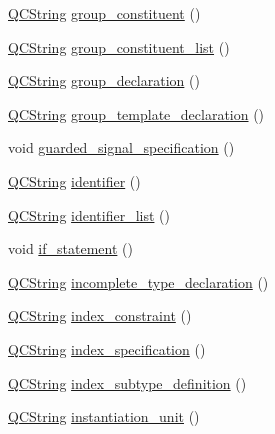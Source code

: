 \begin{DoxyCompactItemize}
\item 
\hyperlink{class_q_c_string}{Q\+C\+String} \hyperlink{classvhdl_1_1parser_1_1_vhdl_parser_a97749f490323d716d39fd7ecaebf63bf}{group\+\_\+constituent} ()
\item 
\hyperlink{class_q_c_string}{Q\+C\+String} \hyperlink{classvhdl_1_1parser_1_1_vhdl_parser_afd7e0fa85b81e44cf87f11a393a92e17}{group\+\_\+constituent\+\_\+list} ()
\item 
\hyperlink{class_q_c_string}{Q\+C\+String} \hyperlink{classvhdl_1_1parser_1_1_vhdl_parser_ac68228d413ae86f8b7cb3216a14e1945}{group\+\_\+declaration} ()
\item 
\hyperlink{class_q_c_string}{Q\+C\+String} \hyperlink{classvhdl_1_1parser_1_1_vhdl_parser_a5b0d30e1e2efb8c9725745d3f38cda4a}{group\+\_\+template\+\_\+declaration} ()
\item 
void \hyperlink{classvhdl_1_1parser_1_1_vhdl_parser_a38e3e2af85ac4ce21f7150f22e68a14c}{guarded\+\_\+signal\+\_\+specification} ()
\item 
\hyperlink{class_q_c_string}{Q\+C\+String} \hyperlink{classvhdl_1_1parser_1_1_vhdl_parser_aba63d9a8e428979881447d900b5dbe6e}{identifier} ()
\item 
\hyperlink{class_q_c_string}{Q\+C\+String} \hyperlink{classvhdl_1_1parser_1_1_vhdl_parser_a57592cdbbae53ae887816581935488d2}{identifier\+\_\+list} ()
\item 
void \hyperlink{classvhdl_1_1parser_1_1_vhdl_parser_a21fbcf1d3710f05ecf79b3ec0947334e}{if\+\_\+statement} ()
\item 
\hyperlink{class_q_c_string}{Q\+C\+String} \hyperlink{classvhdl_1_1parser_1_1_vhdl_parser_a3207beb07fbe39a9ea6fc38e8099729b}{incomplete\+\_\+type\+\_\+declaration} ()
\item 
\hyperlink{class_q_c_string}{Q\+C\+String} \hyperlink{classvhdl_1_1parser_1_1_vhdl_parser_ab18f12daec25ca7d98c790f7b4e6a4f4}{index\+\_\+constraint} ()
\item 
\hyperlink{class_q_c_string}{Q\+C\+String} \hyperlink{classvhdl_1_1parser_1_1_vhdl_parser_ac8c36a4bc347127435759189cd3ba401}{index\+\_\+specification} ()
\item 
\hyperlink{class_q_c_string}{Q\+C\+String} \hyperlink{classvhdl_1_1parser_1_1_vhdl_parser_a5eb8fffec204eeabf80ab04785e5556f}{index\+\_\+subtype\+\_\+definition} ()
\item 
\hyperlink{class_q_c_string}{Q\+C\+String} \hyperlink{classvhdl_1_1parser_1_1_vhdl_parser_aa5d4c772522a0b5deb84e9b8ace14e6d}{instantiation\+\_\+unit} ()
\item 

\end{DoxyCompactItemize}
